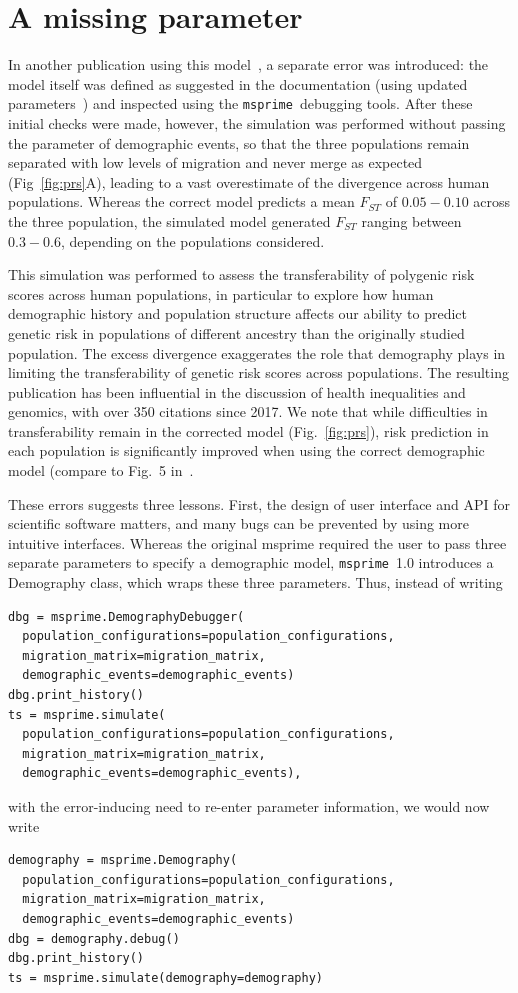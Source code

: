 \documentclass{article}
\newcommand{\msprime}[0]{\texttt{msprime}}
\begin{document}
\section{A missing parameter}

In another publication using this model~\citep{martin2017human},
a separate error was introduced: the model itself was defined as suggested
in the documentation (using updated parameters~\citep{gravel2011demographic}) and inspected using the \msprime\
debugging tools. After these initial checks were made, however, the simulation
was performed without passing the parameter of demographic events,
so that the three populations remain separated with low levels of migration and
never merge as expected (Fig~\ref{fig:prs}A),
leading to a vast overestimate of the divergence across human populations. 
Whereas the correct model predicts a mean $F_{ST}$ of
$0.05 - 0.10$ across the three population, the simulated model generated $F_{ST}$
ranging between $0.3 - 0.6$, depending on the populations considered.

This simulation was performed to assess the
transferability of polygenic risk scores across human populations, in particular to
explore how human demographic history and population structure affects our ability
to predict genetic risk in populations of different ancestry than the originally studied
population. 
The excess divergence exaggerates the role that demography plays in limiting the transferability
of genetic risk scores across populations. The resulting publication has been influential in the discussion of
health inequalities and genomics, with over 350 citations since 2017.
We note that while difficulties in transferability remain in the corrected model
(Fig.~\ref{fig:prs}), risk prediction in each population is significantly improved
when using the correct demographic model (compare to Fig.~5 in~\citet{martin2017human}.

These errors suggests three lessons.
First, the design of user interface and API for scientific software matters,
and many bugs can be prevented by using more intuitive 
interfaces. Whereas the original msprime required the user to pass
three separate parameters to specify a demographic model, \msprime\ 1.0
 introduces a Demography class, which wraps these three parameters.
Thus, instead of writing
\begin{lstlisting}[frame=single]
dbg = msprime.DemographyDebugger(
  population_configurations=population_configurations,
  migration_matrix=migration_matrix,
  demographic_events=demographic_events)
dbg.print_history()
ts = msprime.simulate(
  population_configurations=population_configurations,
  migration_matrix=migration_matrix,
  demographic_events=demographic_events),
\end{lstlisting}
with the error-inducing need to re-enter parameter information,  
we would now write
\begin{lstlisting}[frame=single]
demography = msprime.Demography(
  population_configurations=population_configurations,
  migration_matrix=migration_matrix,
  demographic_events=demographic_events)
dbg = demography.debug()
dbg.print_history()
ts = msprime.simulate(demography=demography)
\end{lstlisting}
\end{document}
